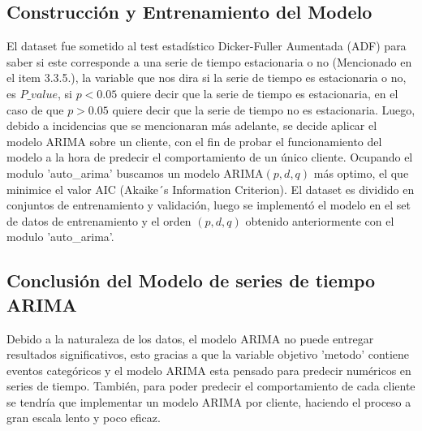 \subsection{Construcción y Entrenamiento del Modelo}

El dataset fue sometido al test estadístico Dicker-Fuller Aumentada (ADF) para saber si este corresponde a una serie de tiempo estacionaria o no (Mencionado en el item 3.3.5.), la variable que nos dira si la serie de tiempo es estacionaria o no, es $P\_value$, si $p<0.05$ quiere decir que la serie de tiempo es estacionaria, en el caso de que $p>0.05$ quiere decir que la serie de tiempo no es estacionaria.
Luego, debido a incidencias que se mencionaran más adelante, se decide aplicar el modelo ARIMA sobre un cliente, con el fin de probar el funcionamiento del modelo a la hora de predecir el comportamiento de un único cliente. Ocupando el modulo 'auto\_arima' buscamos un modelo ARIMA$(p,d,q)$ más optimo, el que minimice el valor AIC (Akaike´s Information Criterion).
El dataset es dividido en conjuntos de entrenamiento y validación, luego se implementó el modelo en el set de datos de entrenamiento y el orden $(p,d,q)$ obtenido anteriormente con el modulo 'auto\_arima'.

\subsection{Conclusión del Modelo de series de tiempo ARIMA}

Debido a la naturaleza de los datos, el modelo ARIMA no puede entregar resultados significativos, esto gracias a que la variable objetivo 'metodo' contiene eventos categóricos y el modelo ARIMA esta pensado para predecir numéricos en series de tiempo. También, para poder predecir el comportamiento de cada cliente se tendría que implementar un modelo ARIMA por cliente, haciendo el proceso a gran escala lento y poco eficaz.
